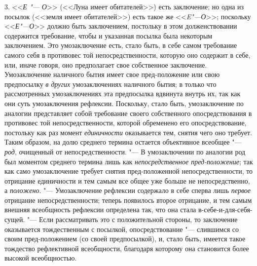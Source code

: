 {{3. <<{\em Е "--- О}>>
(<<Луна имеет обитателей>>) есть заключение; но одна из посылок
(<<земля имеет обитателей>>) есть такое же <<{\em E"---О}>>;
поскольку <<{\em Е"---О}>>
должно быть заключением, постольку в этом долженствовании
содержится требование, чтобы и указанная посылка была некоторым
заключением. Это умозаключение есть, стало быть, в себе самом требование
самого себя в противовес той непосредственности, которую оно содержит в
себе, или, иначе говоря, оно предполагает свое собственное заключение.
Умозаключение наличного бытия имеет свое пред-положение или свою
предпосылку {\em в других}
умозаключениях наличного бытия; в только что
рассмотренных умозаключениях эта предпосылка вдвинута внутрь
их, так как они суть умозаключения рефлексии. Поскольку, стало быть,
умозаключение по аналогии представляет собой требование своего собственного
опосредствования в противовес той непосредственности, которой обременено
его опосредствование, постольку как раз момент
{\em единичности}
оказывается тем, снятия чего оно требует. Таким образом, на
долю среднего термина остается объективное всеобщее
"--- {\em род}, очищенный от
непосредственности. "--- В умозаключении по аналогии род был
моментом среднего термина лишь как
{\em непосредственное пред-положение};
так как само умозаключение требует снятия пред-положенной
непосредственности, то отрицание единичности и тем самым все общее уже
больше не непосредственно, а
{\em положено}. "---
Умозаключение рефлексии содержало в себе сперва лишь
{\em первое} отрицание
непосредственности; теперь появилось второе отрицание, и тем самым внешняя
всеобщность рефлексии определена так, что она стала
в-себе-и-для-себя-сущей. "--- Если рассматривать это с
положительной стороны, то заключение оказывается тождественным с посылкой,
опосредствование "--- слившимся со своим пред-положением (со
своей предпосылкой), и, стало быть, имеется такое тождество рефлективной
всеобщности, благодаря которому она становится более высокой
всеобщностью.

}}
